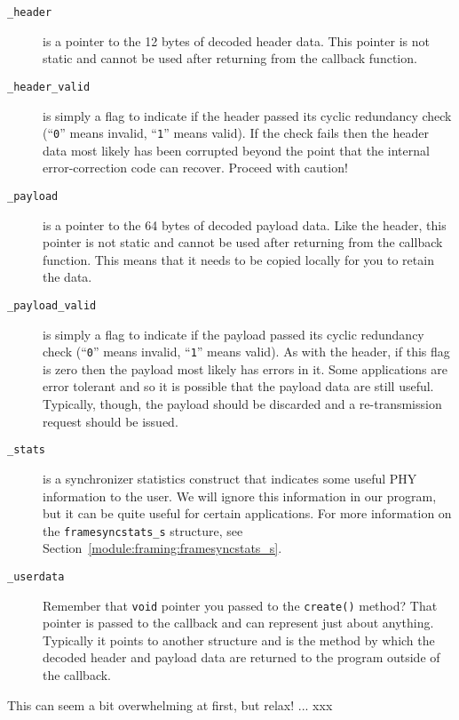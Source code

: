 \begin{description}
\item[{\tt \_header}]
    is a pointer to the 12 bytes of decoded header data.
    This pointer is not static and cannot be used after returning from
    the callback function.
\item[{\tt \_header\_valid}]
    is simply a flag to indicate if the header passed its cyclic
    redundancy check
    (``{\tt 0}'' means invalid, ``{\tt 1}'' means valid).
    If the check fails then the header data most likely has been
    corrupted beyond the point that the internal error-correction code
    can recover.
    Proceed with caution!
\item[{\tt \_payload}]
    is a pointer to the 64 bytes of decoded payload data.
    Like the header,
    this pointer is not static and cannot be used after returning from
    the callback function.
    This means that it needs to be copied locally for you to retain the
    data.
\item[{\tt \_payload\_valid}]
    is simply a flag to indicate if the payload passed its cyclic
    redundancy check
    (``{\tt 0}'' means invalid, ``{\tt 1}'' means valid).
    As with the header,
    if this flag is zero then the payload most likely has errors in it.
    Some applications are error tolerant and so it is possible that the
    payload data are still useful.
    Typically, though, the payload should be discarded and a
    re-transmission request should be issued.
\item[{\tt \_stats}]
    is a synchronizer statistics construct that indicates some useful
    PHY information to the user.
    We will ignore this information in our program, but it can be quite
    useful for certain applications.
    For more information on the {\tt framesyncstats\_s} structure, see
    Section~\ref{module:framing:framesyncstats_s}.
\item[{\tt \_userdata}]
    Remember that {\tt void} pointer you passed to the {\tt create()}
    method?
    That pointer is passed to the callback and can represent just about
    anything.
    Typically it points to another structure and is the method
    by which the decoded header and payload data are returned to the
    program outside of the callback.
\end{description}

This can seem a bit overwhelming at first, but relax!
... xxx



